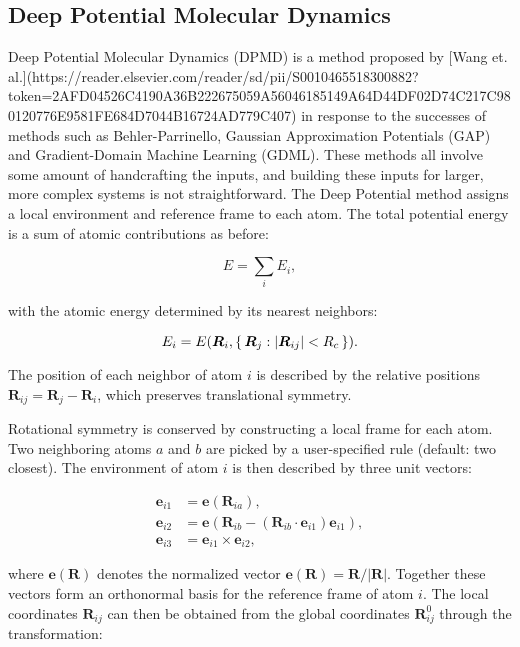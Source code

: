 
\subsection{Deep Potential Molecular Dynamics}
Deep Potential Molecular Dynamics (DPMD) is a method
proposed by [Wang et. al.](https://reader.elsevier.com/reader/sd/pii/S0010465518300882?token=2AFD04526C4190A36B222675059A56046185149A64D44DF02D74C217C980120776E9581FE684D7044B16724AD779C407)
in response to the successes of methods such as Behler-Parrinello,
Gaussian Approximation Potentials (GAP) 
and Gradient-Domain Machine Learning (GDML).
These methods all involve some amount of handcrafting the inputs,
and building these inputs for larger, more complex systems is not
straightforward.
The Deep Potential method assigns a local environment and reference
frame to each atom. The total potential energy is a sum
of atomic contributions as before:

$$ E = \sum_i E_i , $$

with the atomic energy determined by its nearest neighbors:

$$ E_i = E(\bm{R}_i, \set{\bm{R}_j : \left| \bm{R}_{ij} 
    \right| < R_c}) . $$

The position of each neighbor of atom $i$ is described
by the relative positions $\bm{R}_{ij} = \bm{R}_j - \bm{R}_i$,
which preserves translational symmetry.
\par
Rotational symmetry is conserved by constructing a local frame
for each atom. Two neighboring atoms $a$ and $b$ are picked by a 
user-specified rule (default: two closest).
The environment of atom $i$ is then described by three unit vectors:

\begin{equation}
\begin{split}
    \bm{e}_{i1} &= \bm{e}(\bm{R}_{ia}) , \\
    \bm{e}_{i2} &= \bm{e}(\bm{R}_{ib} - (\bm{R}_{ib} \cdot \bm{e}_{i1})
    \bm{e}_{i1}) , \\
    \bm{e}_{i3} &= \bm{e}_{i1} \times \bm{e}_{i2} ,
\end{split}
\end{equation}

where $\bm{e}(\bm{R})$ denotes the normalized vector $\bm{e}(\bm{R})
    = \bm{R} / \left| \bm{R} \right|$. Together these vectors
form an orthonormal basis for the reference frame of atom $i$.
The local coordinates $\bm{R}_{ij}$
can then be obtained from the global coordinates $\bm{R}_{ij}^0$
through the transformation:

